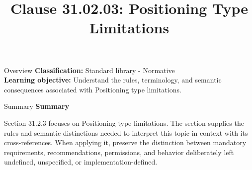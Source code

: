 \documentclass[10pt,letterpaper]{article}
\title{Clause 31.02.03: Positioning Type Limitations}
\author{}
\date{}
\begin{document}
\maketitle
\begin{CornellOverviewBox}{Overview}
\textbf{Classification:} Standard library - Normative\\[2pt]
\textbf{Learning objective:} Understand the rules, terminology, and semantic consequences associated with Positioning type limitations.
\end{CornellOverviewBox}\begin{CornellSummaryBox}{Summary}
{\sffamily\bfseries\color{Accent} Summary}\par\vspace{3pt}Section 31.2.3 focuses on Positioning type limitations. The section supplies the rules and semantic distinctions needed to interpret this topic in context with its cross-references. When applying it, preserve the distinction between mandatory requirements, recommendations, permissions, and behavior deliberately left undefined, unspecified, or implementation-defined.
\end{CornellSummaryBox}
\end{document}
